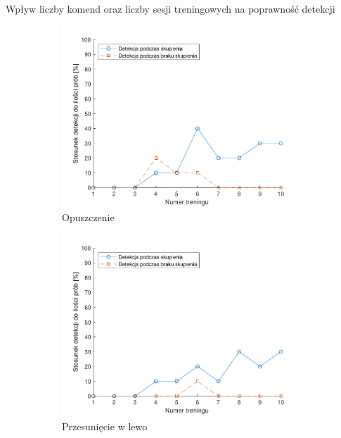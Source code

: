 \documentclass[10pt,aspectratio=169]{beamer}
\begin{document}
\begin{frame}{Wpływ liczby komend oraz liczby sesji treningowych na poprawność detekcji}
\begin{figure}[htb]
    \begin{subfigure}{0.3\linewidth}
    \includegraphics[width=\linewidth,keepaspectratio]{obrazy/down}
    \caption{Opuszczenie}
    \end{subfigure}
    \medskip
    \hspace*{\fill}
    \begin{subfigure}{0.3\linewidth}
    \includegraphics[width=\linewidth,keepaspectratio]{obrazy/left}
    \caption{Przesunięcie w lewo}
    \end{subfigure}\hspace*{\fill}
    \begin{subfigure}{0.3\linewidth}

\end{subfigure}
\end{figure}
\end{frame}
\end{document}
